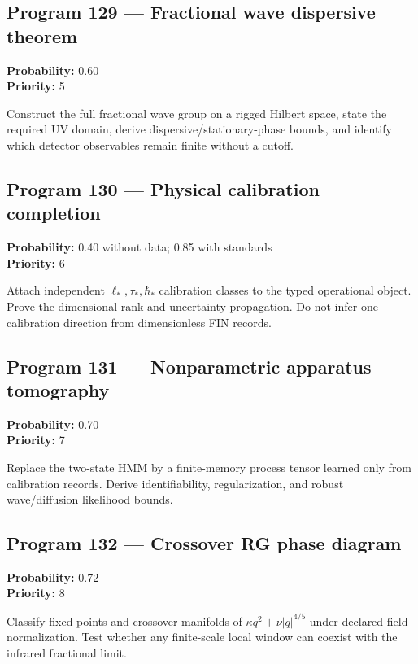 \documentclass[11pt,a4paper,openany]{report}
\begin{document}
\subsection{Program 129 --- Fractional wave dispersive theorem}

\textbf{Probability:} 0.60\\
\textbf{Priority:} 5

Construct the full fractional wave group on a rigged Hilbert space, state the required UV domain, derive dispersive/\allowbreak{}stationary-phase bounds, and identify which detector observables remain finite without a cutoff.

\subsection{Program 130 --- Physical calibration completion}

\textbf{Probability:} 0.40 without data; 0.85 with standards\\
\textbf{Priority:} 6

Attach independent \(\ell_*,\tau_*,\hbar_*\) calibration classes to the typed operational object. Prove the dimensional rank and uncertainty propagation. Do not infer one calibration direction from dimensionless FIN records.

\subsection{Program 131 --- Nonparametric apparatus tomography}

\textbf{Probability:} 0.70\\
\textbf{Priority:} 7

Replace the two-state HMM by a finite-memory process tensor learned only from calibration records. Derive identifiability, regularization, and robust wave/\allowbreak{}diffusion likelihood bounds.

\subsection{Program 132 --- Crossover RG phase diagram}

\textbf{Probability:} 0.72\\
\textbf{Priority:} 8

Classify fixed points and crossover manifolds of \(\kappa q^2+\nu|q|^{4/5}\) under declared field normalization. Test whether any finite-scale local window can coexist with the infrared fractional limit.
\end{document}
